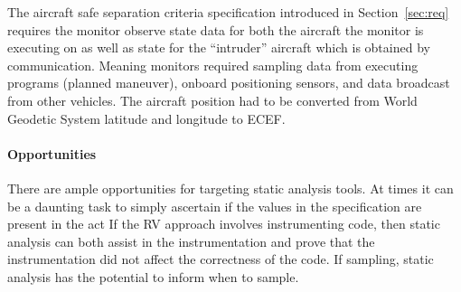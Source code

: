   The aircraft safe separation criteria specification introduced in
  Section~\ref{sec:req} requires the monitor observe state data for
  both the aircraft the monitor is executing on as well as state for
  the ``intruder'' aircraft which is obtained by
  communication.  Meaning monitors required sampling data from
  executing programs (planned maneuver), onboard positioning sensors,
  and data broadcast from other vehicles.  The aircraft position had
  to be converted from World Geodetic System latitude and longitude to
  ECEF.

\paragraph{Opportunities}  There are ample opportunities for targeting
static analysis tools. At times it can be a daunting task to simply
ascertain if the values in the specification are present in the act If the RV approach involves
instrumenting code, then static analysis can both assist in the
instrumentation and prove that the instrumentation did not affect the
correctness of the code. If sampling, static analysis has the
potential to inform when to sample. 
  

